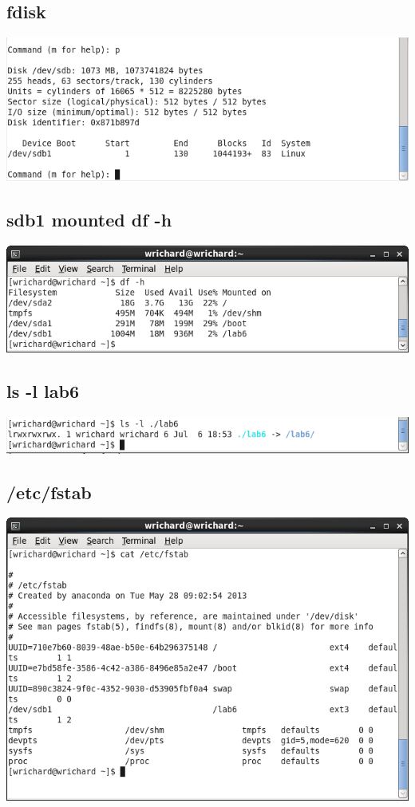 \documentclass[a4paper,10pt]{article}
\begin{document}
\subsection{fdisk}
  \begin{center}
  \includegraphics[width=\linewidth]{./fdisk_info.png}
  \end{center}

\subsection{sdb1 mounted df -h}
  \begin{center}
  \includegraphics[width=\linewidth]{./sdb1_mounted.png}
  \end{center}

\subsection{ls -l lab6}
  \begin{center}
  \includegraphics[width=\linewidth]{./lab6_soft_link.png}
  \end{center}

\subsection{/etc/fstab}
  \begin{center}
  \includegraphics[width=\linewidth]{./fstab.png}
  \end{center}
\end{document}
